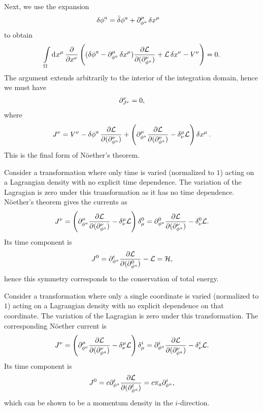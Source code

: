 Next, we use the expansion
\begin{align*}
	\var{\phi}^{a}  &= \bar{\delta}\phi^{a} + \partial^{\mu}_{\phi^{a}}\var{x}^{\mu}
\end{align*}
to obtain
\begin{align*}
	\int\limits_{\Omega}^{}\dd[]{x^{\mu}}\pdv{x^{\nu}}\left((\var{\phi}^{a} - \partial^{\mu}_{\phi^{a}}\var{x}^{\mu})\pdv{\ensuremath{\mathcal{L}}}{(\ensuremath{\partial^{\nu}_{\phi^{a}}})} + \mathcal{L}\var{x^{\nu}} - V^{\nu}\right) = 0.
\end{align*}
The argument extends arbitrarily to the interior of the integration domain, hence we must have
\begin{align*}
	\partial^{\nu}_{J^{\nu}} = 0,
\end{align*}
where
\begin{align*}
	J^{\nu} = V^{\nu} - \var{\phi}^{a}\pdv{\lag}{(\del{\nu}{\phi^{a}})} + \left(\del{\mu}{\phi^{a}}\pdv{\lag}{(\del{\nu}{\phi^{a}})} - \kdelta{\mu}{\nu}\lag\right)\var{x^{\mu}}.
\end{align*}
This is the final form of Nöether's theorem.

Consider a transformation where only time is varied (normalized to $1$) acting on a Lagrangian density with no explicit time dependence. The variation of the Lagragian is zero under this transformation as it has no time dependence. Nöether's theorem gives the currents as
\begin{align*}
	J^{\nu} = \left(\del{\mu}{\phi^{a}}\pdv{\lag}{(\del{\nu}{\phi^{a}})} - \kdelta{\mu}{\nu}\lag\right)\kdelta{0}{\mu} = \del{0}{\phi^{a}}\pdv{\lag}{(\del{\nu}{\phi^{a}})} - \kdelta{0}{\nu}\lag.
\end{align*}
Its time component is
\begin{align*}
	J^{0} = \partial^{i}_{\phi^{a}}\pdv{\ensuremath{\mathcal{L}}}{(\ensuremath{\partial^{0}_{\phi^{a}}})} - \mathcal{L} = \mathcal{H},
\end{align*}
hence this symmetry corresponds to the conservation of total energy.

Consider a transformation where only a single coordinate is varied (normalized to $1$) acting on a Lagrangian density with no explicit dependence on that coordinate. The variation of the Lagragian is zero under this transformation. The corresponding Nöether current is
\begin{align*}
	J^{\nu} = \left(\del{\mu}{\phi^{a}}\pdv{\lag}{(\del{\nu}{\phi^{a}})} - \kdelta{\mu}{\nu}\lag\right)\kdelta{i}{\mu} = \del{i}{\phi^{a}}\pdv{\lag}{(\del{\nu}{\phi^{a}})} - \kdelta{i}{\nu}\lag.
\end{align*}
Its time component is
\begin{align*}
	J^{0} = c\partial^{i}_{\phi^{a}}\pdv{\ensuremath{\mathcal{L}}}{(\ensuremath{\partial^{t}_{\phi^{a}}})} = c\pi_{a}\partial^{i}_{\phi^{a}},
\end{align*}
which can be shown to be a momentum density in the $i$-direction.

